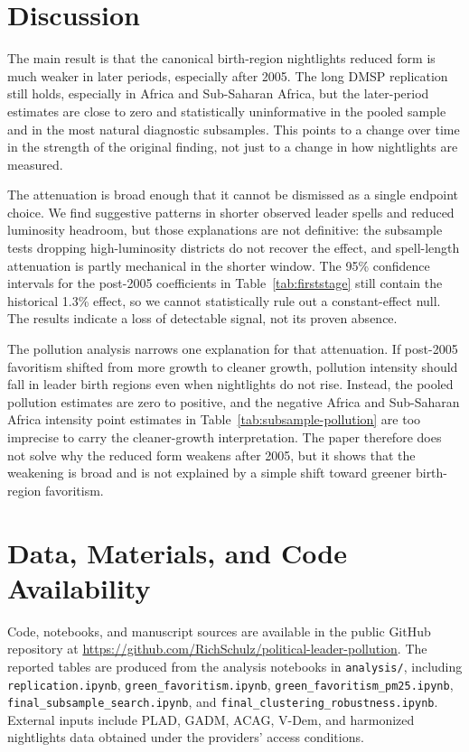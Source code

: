 \documentclass[9pt,twocolumn,twoside]{pnas-new}
\begin{document}
\section{Discussion}

The main result is that the canonical birth-region nightlights reduced form is much weaker in later periods, especially after 2005. The long DMSP replication still holds, especially in Africa and Sub-Saharan Africa, but the later-period estimates are close to zero and statistically uninformative in the pooled sample and in the most natural diagnostic subsamples. This points to a change over time in the strength of the original finding, not just to a change in how nightlights are measured.

The attenuation is broad enough that it cannot be dismissed as a single endpoint choice. We find suggestive patterns in shorter observed leader spells and reduced luminosity headroom, but those explanations are not definitive: the subsample tests dropping high-luminosity districts do not recover the effect, and spell-length attenuation is partly mechanical in the shorter window. The 95\% confidence intervals for the post-2005 coefficients in Table~\ref{tab:firststage} still contain the historical 1.3\% effect, so we cannot statistically rule out a constant-effect null. The results indicate a loss of detectable signal, not its proven absence.

The pollution analysis narrows one explanation for that attenuation. If post-2005 favoritism shifted from more growth to cleaner growth, pollution intensity should fall in leader birth regions even when nightlights do not rise. Instead, the pooled pollution estimates are zero to positive, and the negative Africa and Sub-Saharan Africa intensity point estimates in Table~\ref{tab:subsample-pollution} are too imprecise to carry the cleaner-growth interpretation. The paper therefore does not solve why the reduced form weakens after 2005, but it shows that the weakening is broad and is not explained by a simple shift toward greener birth-region favoritism.

\showacknow

\section*{Data, Materials, and Code Availability}

Code, notebooks, and manuscript sources are available in the public GitHub repository at \url{https://github.com/RichSchulz/political-leader-pollution}. The reported tables are produced from the analysis notebooks in \texttt{analysis/}, including \texttt{replication.ipynb}, \texttt{green\_favoritism.ipynb}, \texttt{green\_favoritism\_pm25.ipynb}, \texttt{final\_subsample\_search.ipynb}, and \texttt{final\_clustering\_robustness.ipynb}. External inputs include PLAD, GADM, ACAG, V-Dem, and harmonized nightlights data obtained under the providers' access conditions.


\end{document}
